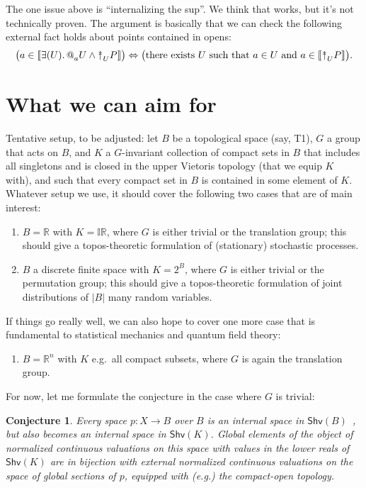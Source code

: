 \documentclass[11pt, oneside, article]{memoir}
\makeatletter
\theoremstyle{plain}
\newtheorem{conjecture}[theorem]{Conjecture}
\theoremstyle{definition}
\theoremstyle{remark}
\DeclarePairedDelimiter{\church}{\llbracket}{\rrbracket}
\newcommand{\Fun}[1]{\mathsf{#1}}
\newcommand{\RR}{\mathbb{R}}
\newcommand{\Shv}{\Fun{Shv}}
\newcommand{\AtSymbol}{{@}}
\newcommand{\InSymbol}{{\upclose}}%
\newcommand{\At}[2][]{\AtSymbol^{#1}_{#2}}
\newcommand{\In}[2][]{\InSymbol^{#1}_{#2}}
\newcommand{\upclose}{{\rotatebox[origin=c]{90}{$\twoheadrightarrow$}}}
\renewcommand{\iff}{\Leftrightarrow}
\makeatother
\begin{document}
The one issue above is ``internalizing the sup''. We think that works, but it's not technically proven. The argument is basically that we can check the following external fact holds about points contained in opens:
\[\big(a\in\church{\exists(U)\ldotp\At{a}U\wedge\In{U}P}\big)\iff\big(\text{there exists $U$ such that $a\in U$ and }a\in\church{\In{U}P}\big).\]

\section{What we can aim for}

Tentative setup, to be adjusted: let $B$ be a topological space (say, T1), $G$ a group that acts on $B$, and $K$ a $G$-invariant collection of compact sets in $B$ that includes all singletons and is closed in the upper Vietoris topology (that we equip $K$ with), and such that every compact set in $B$ is contained in some element of $K$. Whatever setup we use, it should cover the following two cases that are of main interest:

\begin{enumerate}
\item $B = \RR$ with $K = \mathbb{IR}$, where $G$ is either trivial or the translation group; this should give a topos-theoretic formulation of (stationary) stochastic processes.
\item $B$ a discrete finite space with $K = 2^B$, where $G$ is either trivial or the permutation group; this should give a topos-theoretic formulation of joint distributions of $|B|$ many random variables.
\end{enumerate}

If things go really well, we can also hope to cover one more case that is fundamental to statistical mechanics and quantum field theory:

\begin{enumerate}[resume]
\item $B = \RR^n$ with $K$ e.g.~all compact subsets, where $G$ is again the translation group.
\end{enumerate}

For now, let me formulate the conjecture in the case where $G$ is trivial:

\begin{conjecture}
Every space $p : X\to B$ over $B$ is an internal space in $\Shv(B)$~\cite{Moerdijk:1984a}, but also becomes an internal space in $\Shv(K)$. Global elements of the object of normalized continuous valuations on this space with values in the lower reals of $\Shv(K)$ are in bijection with external normalized continuous valuations on the space of global sections of $p$, equipped with (e.g.) the compact-open topology.
\end{conjecture}
\end{document}
